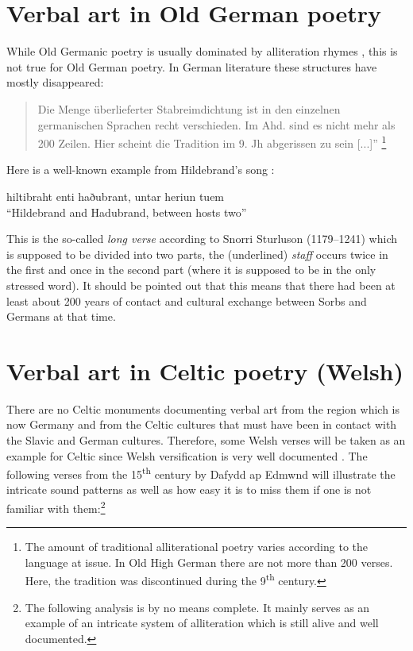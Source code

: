\documentclass[output=paper,hidelinks]{langscibook}
\begin{document}
\section{Verbal art in Old German poetry}
 
While Old Germanic poetry is usually dominated by alliteration rhymes \citep[435ff]{Jankuhn2005}, this is not true for Old German poetry. In German literature these structures have mostly disappeared: 
 

\begin{quote}
Die Menge überlieferter Stabreimdichtung ist in den einzelnen germanischen Sprachen recht verschieden. Im Ahd. sind es nicht mehr als 200 Zeilen. Hier scheint die Tradition im 9. Jh abgerissen zu sein [...]” \citep[1f]{vonSee1967}\footnote{The amount of traditional alliterational poetry varies according to the language at issue. In Old High German there are not more than 200 verses. Here, the tradition was discontinued during the 9\textsuperscript{th} century.} 
\end{quote}

 
Here is a well-known example from Hildebrand’s song \citep[864]{vonEckhart1729}:
 
\ea 
\textup{hiltibraht enti haðubrant, untar heriun tuem}\\
“Hildebrand and Hadubrand, between hosts two”\z

 
This is the so-called \textit{long verse} according to Snorri Sturluson (1179–1241) which is supposed to be divided into two parts, the (underlined) \textit{staff} occurs twice in the first and once in the second part (where it is supposed to be in the only stressed word). It should be pointed out that this means that there had been at least about 200 years of contact and cultural exchange between Sorbs and Germans at that time.
 

\section{Verbal art in Celtic poetry (Welsh)}
 \largerpage
There are no Celtic monuments documenting verbal art from the region which is now Germany and from the Celtic cultures that must have been in contact with the Slavic and German cultures. Therefore, some Welsh verses will be taken as an example for Celtic since Welsh versification is very well documented \citep{Morris-Jones1930, Llwyd2007}. The following verses from the 15\textsuperscript{th} century by Dafydd ap Edmwnd will illustrate the intricate sound patterns as well as how easy it is to miss them if one is not familiar with them:\footnote{The following analysis is by no means complete. It mainly serves as an example of an intricate system of alliteration which is still alive and well documented.}
 
\end{document}
